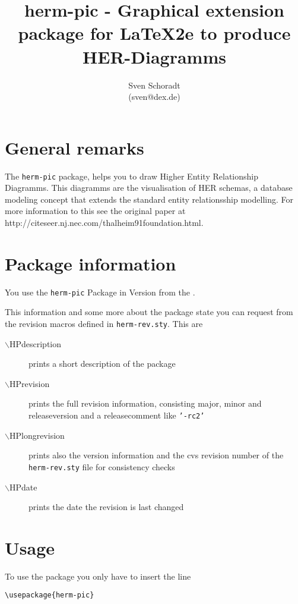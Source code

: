 \documentclass[a4paper,11pt]{article}
\author{Sven Schoradt \\ (sven@dex.de)}
\title{herm-pic - Graphical extension package for LaTeX2e to produce HER-Diagramms}
\begin{document}
\maketitle

\section{General remarks}

The {\tt herm-pic} package, helps you to draw Higher Entity Relationship Diagramms.
This diagramms are the visualisation of HER schemas, a database modeling 
concept that extends the standard entity relationsship modelling. 
For more information to this see the original paper at 
http://citeseer.nj.nec.com/thalheim91foundation.html.

\section{Package information}

You use the {\tt herm-pic} Package in Version \HPlongrevision{} from the \HPdate.

This information and some more about the package state you can request from the 
revision macros defined in {\tt herm-rev.sty}. This are

\begin{description}
\item[$\backslash{}$HPdescription] prints a short description of the package
\item[$\backslash{}$HPrevision] prints the full revision information, consisting major, minor and releaseversion
  and a releasecomment like {\tt '-rc2'}
\item[$\backslash{}$HPlongrevision] prints also the version information and the cvs revision number of the 
  {\tt herm-rev.sty} file for consistency checks
\item[$\backslash{}$HPdate] prints the date the revision is last changed
\end{description}

\section{Usage}

To use the package you only have to insert the line

\begin{verbatim}
\usepackage{herm-pic}
\end{verbatim}
\end{document}
